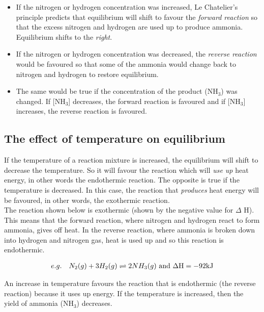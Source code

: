 \begin{itemize}
\item{If the nitrogen or hydrogen concentration was increased, Le Chatelier's principle predicts that equilibrium will shift to favour the \textit{forward reaction} so that the excess nitrogen and hydrogen are used up to produce ammonia. Equilibrium shifts to the \textit{right}.} 

\item{If the nitrogen or hydrogen concentration was decreased, the \textit{reverse reaction} would be favoured so that some of the ammonia would change back to nitrogen and hydrogen to restore equilibrium.}

\item{The same would be true if the concentration of the product (NH$_{3}$) was changed. If [NH$_{3}$] decreases, the forward reaction is favoured and if [NH$_{3}$] increases, the reverse reaction is favoured.}
\end{itemize}


\subsection{The effect of temperature on equilibrium}

If the temperature of a reaction mixture is increased, the equilibrium will shift to decrease the temperature. So
it will favour the reaction which will \textit{use up} heat energy, in other words the endothermic reaction. The opposite is true if the temperature is decreased. In this case, the reaction that \textit{produces} heat energy will be favoured, in other words, the exothermic reaction.\\

The reaction shown below is exothermic (shown by the negative value for $\Delta$ H). This means that the forward reaction, where nitrogen and hydrogen react to form ammonia, gives off heat. In the reverse reaction, where ammonia is broken down into hydrogen and nitrogen gas, heat is used up and so this reaction is endothermic.

\begin{eqnarray*}
  & e.g. & N_{2}(g) + 3H_{2}(g) \rightleftharpoons  2NH_{3}(g) \ \rm{and} \
  \Delta H = -92kJ
\end{eqnarray*}

An increase in temperature favours the reaction that is endothermic (the reverse reaction) because it uses up energy. If the temperature is increased, then the yield of ammonia (NH$_{3}$) decreases. \\

